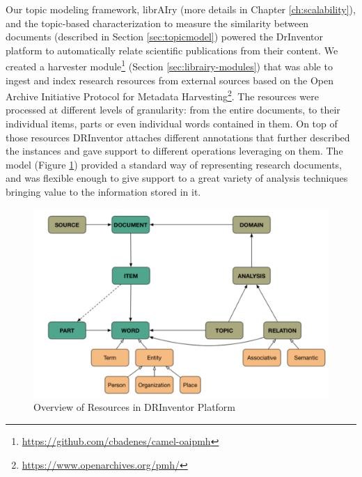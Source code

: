 Our topic modeling framework, librAIry (more details in Chapter \ref{ch:scalability}), and the topic-based characterization to measure the similarity between documents (described in Section \ref{sec:topicmodel}) powered the DrInventor platform to automatically relate scientific publications from their content. We created a harvester module\footnote{\url{https://github.com/cbadenes/camel-oaipmh}} (Section \ref{sec:librairy-modules})  that was able to ingest and index research resources from external sources based on the Open Archive Initiative Protocol for Metadata Harvesting\footnote{\url{https://www.openarchives.org/pmh/}}. The resources were processed at different levels of granularity: from the entire documents, to their individual items, parts or even individual words contained in them. On top of those resources DRInventor attaches different annotations that further described the instances and gave support to different operations leveraging on them. The model (Figure \ref{fig:drinventor-model}) provided a standard way of representing research documents, and was flexible enough to give support to a great variety of analysis techniques bringing value to the information stored in it. 

\begin{figure}[ht]
    \centering
    \includegraphics[width=0.8\linewidth]{drinventor-model.png}
    \caption{Overview of Resources in DRInventor Platform}
    \label{fig:drinventor-model}
\end{figure}


